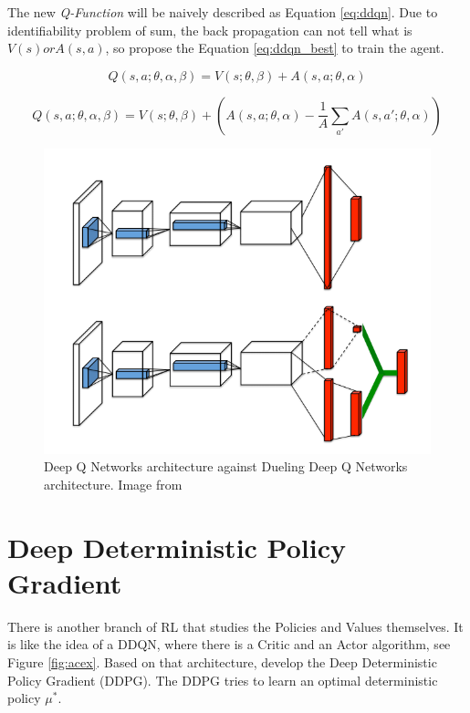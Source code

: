 The new \textit{Q-Function} will be naively described as Equation \ref{eq:ddqn}. Due to identifiability problem of sum, the back propagation can not tell what is $V(s) or A(s,a)$, so \cite{DDQN} propose the Equation \ref{eq:ddqn_best} to train the agent.

\begin{equation}
    Q(s,a;\theta, \alpha, \beta) = V(s; \theta, \beta) + A(s, a; \theta, \alpha)
\label{eq:ddqn}
\end{equation}

\begin{equation}
    Q(s,a;\theta, \alpha, \beta) = V(s; \theta, \beta) + (A(s, a; \theta, \alpha) - \frac{1}{A}\sum_{a'}A(s, a'; \theta, \alpha))
\label{eq:ddqn_best}
\end{equation}

\begin{figure}[H]
    \centering
    \includegraphics[scale=0.4]{images/dddqn.png}
    \caption{Deep Q Networks architecture against Dueling Deep Q Networks architecture. Image from \cite{DDQN}}
    \label{fig:ddqn}
\end{figure}

\section{Deep Deterministic Policy Gradient}\label{section:ddpg}
There is another branch of RL that studies the Policies and Values themselves. It is like the idea of a DDQN, where there is a Critic and an Actor algorithm, see Figure \ref{fig:acex}. Based on that architecture, \cite{DDPG} develop the Deep Deterministic Policy Gradient (DDPG). The DDPG tries to learn an optimal deterministic policy $\mu^*$.

